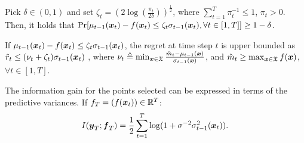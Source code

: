\begin{lem}
\label{lem:pbound}
Pick $\delta\in(0,1)$ and set $\zeta_{t} = (2\log(\frac{\pi_t}{2\delta}))^\frac12$, where $\sum_{t=1}^T \pi_t^{-1} \leq 1$, $\pi_t > 0$. Then, it holds that
$ \Pr [  \mu_{t-1}({\boldsymbol{x}}_{t}) -f( {\boldsymbol{x}}_{t})  \leq \zeta_{t}\sigma_{t-1}({\boldsymbol{x}}_{t}), \forall t\in [1,T]] \geq 1-\delta$.
\end{lem}
\begin{lem}
\label{regretlem}
%
If $ \mu_{t-1}({\boldsymbol{x}}_{t}) -f({\boldsymbol{x}}_{t}) \leq \zeta_t\sigma_{t-1}({\boldsymbol{x}}_{t})$, the regret at time step $t$ is upper bounded as $\tilde{r}_t \leq (\nu_t  +\zeta_t )\sigma_{t-1}({\boldsymbol{x}}_{t})$ %
, where $\nu_t  \triangleq \min_{{\boldsymbol{x}}\in\mathfrak X} \frac{\hat m_t-\mu_{t-1}({\boldsymbol{x}})}{\sigma_{t-1}({\boldsymbol{x}})}$, and $\hat m_t\geq \max_{{\boldsymbol{x}}\in \mathfrak X} f({\boldsymbol{x}})$, $\forall t\in[1,T]$.
\end{lem}
\begin{lem}
\label{lem:info}
The information gain for the points selected can be expressed in terms of the predictive variances. If $f_T = (f({\boldsymbol{x}}_t))\in \mathbb{R}^T$:
$$I(\boldsymbol{y}_T; \boldsymbol{f}_T) = \frac12 \sum_{t=1}^T \log(1+\sigma^{-2}\sigma^2_{t-1}({\boldsymbol{x}}_t)).$$
\end{lem}
